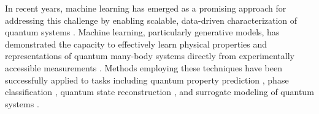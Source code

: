 \documentclass[pdflatex,sn-mathphys-num]{sn-jnl}%
\theoremstyle{thmstyleone}%
\theoremstyle{thmstyletwo}%
\theoremstyle{thmstylethree}%
\begin{document}
In recent years, machine learning has emerged as a promising approach for addressing this challenge by enabling scalable, data-driven characterization of quantum systems \cite{carleo2019machine, carleo2017solving}. Machine learning, particularly generative models, has demonstrated the capacity to effectively learn physical properties and representations of quantum many-body systems directly from experimentally accessible measurements \cite{carrasquilla2017machine, liu2018differentiable}. Methods employing these techniques have been successfully applied to tasks including quantum property prediction \cite{schutt2017schnet, wanner2024predicting, yao2024shadowgpt}, phase classification \cite{cho2024machine}, quantum state reconstruction \cite{torlai2018neural, carrasquilla2019reconstructing}, and surrogate modeling of quantum systems \cite{pfau2020ab}. 
\end{document}
